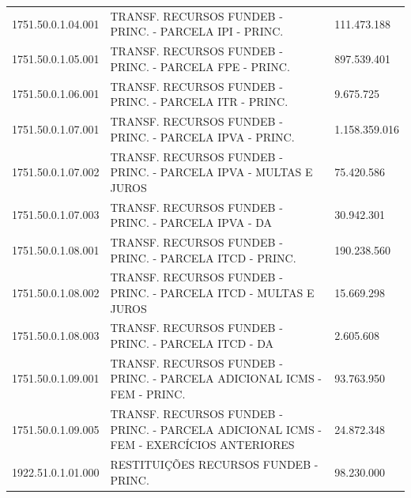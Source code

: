 \documentclass{article}
\begin{document}
\begin{longtable}[c]{m{2.5cm}|m{14cm}|m{1.5cm}}
\multicolumn{1}{L{2.5cm}|}{1751.50.0.1.04.001} & \multicolumn{1}{L{14cm}|}{TRANSF. RECURSOS FUNDEB - PRINC. - PARCELA IPI - PRINC.} & \multicolumn{1}{R{1.5cm}}{111.473.188} \\
\multicolumn{1}{L{2.5cm}|}{1751.50.0.1.05.001} & \multicolumn{1}{L{14cm}|}{TRANSF. RECURSOS FUNDEB - PRINC. - PARCELA FPE - PRINC.} & \multicolumn{1}{R{1.5cm}}{897.539.401} \\
\multicolumn{1}{L{2.5cm}|}{1751.50.0.1.06.001} & \multicolumn{1}{L{14cm}|}{TRANSF. RECURSOS FUNDEB - PRINC. - PARCELA ITR - PRINC.} & \multicolumn{1}{R{1.5cm}}{9.675.725} \\
\multicolumn{1}{L{2.5cm}|}{1751.50.0.1.07.001} & \multicolumn{1}{L{14cm}|}{TRANSF. RECURSOS FUNDEB - PRINC. - PARCELA IPVA - PRINC.} & \multicolumn{1}{R{1.5cm}}{1.158.359.016} \\
\multicolumn{1}{L{2.5cm}|}{1751.50.0.1.07.002} & \multicolumn{1}{L{14cm}|}{TRANSF. RECURSOS FUNDEB - PRINC. - PARCELA IPVA - MULTAS E JUROS} & \multicolumn{1}{R{1.5cm}}{75.420.586} \\
\multicolumn{1}{L{2.5cm}|}{1751.50.0.1.07.003} & \multicolumn{1}{L{14cm}|}{TRANSF. RECURSOS FUNDEB - PRINC. - PARCELA IPVA - DA} & \multicolumn{1}{R{1.5cm}}{30.942.301} \\
\multicolumn{1}{L{2.5cm}|}{1751.50.0.1.08.001} & \multicolumn{1}{L{14cm}|}{TRANSF. RECURSOS FUNDEB - PRINC. - PARCELA ITCD - PRINC.} & \multicolumn{1}{R{1.5cm}}{190.238.560} \\
\multicolumn{1}{L{2.5cm}|}{1751.50.0.1.08.002} & \multicolumn{1}{L{14cm}|}{TRANSF. RECURSOS FUNDEB - PRINC. - PARCELA ITCD - MULTAS E JUROS} & \multicolumn{1}{R{1.5cm}}{15.669.298} \\
\multicolumn{1}{L{2.5cm}|}{1751.50.0.1.08.003} & \multicolumn{1}{L{14cm}|}{TRANSF. RECURSOS FUNDEB - PRINC. - PARCELA ITCD - DA} & \multicolumn{1}{R{1.5cm}}{2.605.608} \\
\multicolumn{1}{L{2.5cm}|}{1751.50.0.1.09.001} & \multicolumn{1}{L{14cm}|}{TRANSF. RECURSOS FUNDEB - PRINC. - PARCELA ADICIONAL ICMS - FEM - PRINC.} & \multicolumn{1}{R{1.5cm}}{93.763.950} \\
\multicolumn{1}{L{2.5cm}|}{1751.50.0.1.09.005} & \multicolumn{1}{L{14cm}|}{TRANSF. RECURSOS FUNDEB - PRINC. - PARCELA ADICIONAL ICMS - FEM - EXERCÍCIOS ANTERIORES} & \multicolumn{1}{R{1.5cm}}{24.872.348} \\
\multicolumn{1}{L{2.5cm}|}{1922.51.0.1.01.000} & \multicolumn{1}{L{14cm}|}{RESTITUIÇÕES RECURSOS FUNDEB - PRINC.} & \multicolumn{1}{R{1.5cm}}{98.230.000} \\

\end{longtable}
\end{document}
